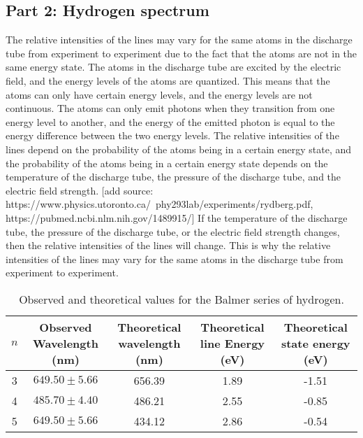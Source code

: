 
\subsection{Part 2: Hydrogen spectrum}



The relative intensities of the lines may vary for the same atoms in the discharge tube from experiment to experiment due to the fact that the atoms are not in the same energy state.
The atoms in the discharge tube are excited by the electric field, and the energy levels of the atoms are quantized.
This means that the atoms can only have certain energy levels, and the energy levels are not continuous.
The atoms can only emit photons when they transition from one energy level to another, and the energy of the emitted photon is equal to the energy difference between the two energy levels.
The relative intensities of the lines depend on the probability of the atoms being in a certain energy state, and the probability of the atoms being in a certain energy state depends on the temperature of the discharge tube,
the pressure of the discharge tube, and the electric field strength. [add source: https://www.physics.utoronto.ca/~phy293lab/experiments/rydberg.pdf, https://pubmed.ncbi.nlm.nih.gov/1489915/] If the temperature of the discharge tube, the pressure of the discharge tube, or the electric field strength changes, then the relative intensities of the lines will change.
This is why the relative intensities of the lines may vary for the same atoms in the discharge tube from experiment to experiment.

\begin{table}[h]

    \centering
    \begin{adjustbox}{width=1.5\textwidth, center}
        \begin{tabular}{|c|c|c|c|c|}
            \hline
            $n$ & Observed Wavelength (nm) & Theoretical wavelength (nm) & Theoretical line Energy (eV) & Theoretical state energy (eV) \\
            \hline
            3   & $649.50 \pm 5.66$        & 656.39                      & 1.89                         & -1.51                         \\
            4   & $485.70 \pm 4.40$        & 486.21                      & 2.55                         & -0.85                         \\
            5   & $649.50 \pm 5.66$        & 434.12                      & 2.86                         & -0.54                         \\
            \hline
        \end{tabular}
    \end{adjustbox}
    \caption{Observed and theoretical values for the Balmer series of hydrogen.}
    \label{tab:my_label}
\end{table}